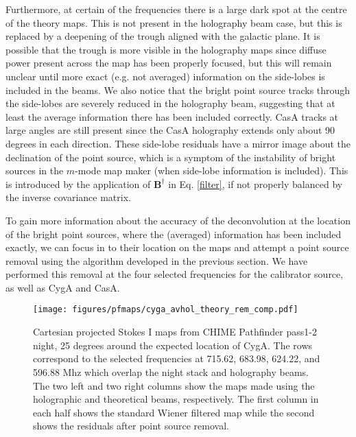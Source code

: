 Furthermore, at certain of the frequencies there is a large dark spot at the centre of the theory maps. This is not present in the holography beam case, but this is replaced by a deepening of the trough aligned with the galactic plane. It is possible that the trough is more visible in the holography maps since diffuse power present across the map has been properly focused, but this will remain unclear until more exact (e.g. not averaged) information on the side-lobes is included in the beams. We also notice that the bright point source tracks through the side-lobes are severely reduced in the holography beam, suggesting that at least the average information there has been included correctly. CasA tracks at large angles are still present since the CasA holography extends only about 90 degrees in each direction. These side-lobe residuals have a mirror image about the declination of the point source, which is a symptom of the instability of bright sources in the $m$-mode map maker (when side-lobe information is included). This is introduced by the application of $\mathbf{B}^\dagger$ in Eq. \ref{filter}, if not properly balanced by the inverse covariance matrix.

To gain more information about the accuracy of the deconvolution at the location of the bright point sources, where the (averaged) information has been included exactly, we can focus in to their location on the maps and attempt a point source removal using the algorithm developed in the previous section. We have performed this removal at the four selected frequencies for the calibrator source, as well as CygA and CasA.

\begin{figure}
\centering
\texttt{[image: figures/pfmaps/cyga\_avhol\_theory\_rem\_comp.pdf]}
\caption{Cartesian projected Stokes I maps from CHIME Pathfinder pass1-2 night, 25 degrees around the expected location of CygA. The rows correspond to the selected frequencies at 715.62, 683.98, 624.22, and 596.88 Mhz which overlap the night stack and holography beams. The two left and two right columns show the maps made using the holographic and theoretical beams, respectively. The first column in each half shows the standard Wiener filtered map while the second shows the residuals after point source removal.}
\label{cyga_comparison}
\end{figure}


